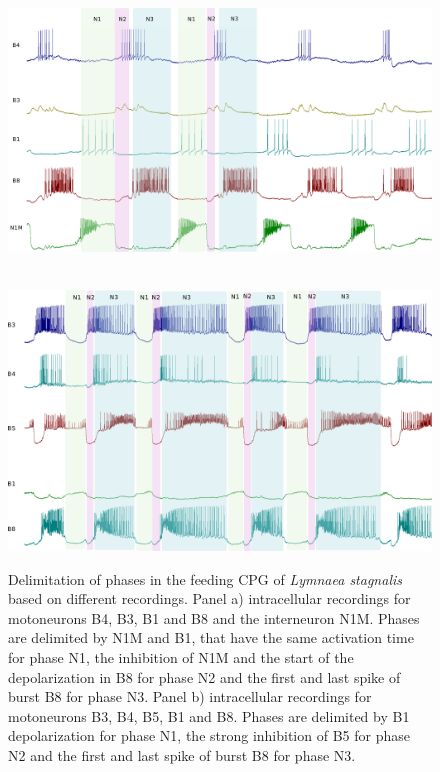 \begin{figure}[bth!]
	\centering
	\begin{minipage}[b]{0.9\textwidth}
		\\
		\centering
		\includegraphics[width=\textwidth]{img/invariants/example_phases_1.pdf}
	\end{minipage}
	\vspace{20pt}
	\begin{minipage}[b]{0.9\textwidth}
		\\
		\centering
		\includegraphics[width=\textwidth]{img/invariants/example_phases_2.pdf}
	\end{minipage}
	\caption{Delimitation of phases in the feeding CPG of \textit{Lymnaea stagnalis} based on different recordings. Panel a) intracellular recordings for motoneurons B4, B3, B1 and B8 and the interneuron N1M. Phases are delimited by N1M and B1, that have the same activation time for phase N1, the inhibition of N1M and the start of the depolarization in B8 for phase N2 and the first and last spike of burst B8 for phase N3. Panel b) intracellular recordings for motoneurons B3, B4, B5, B1 and B8. Phases are delimited by B1 depolarization for phase N1, the strong inhibition of B5 for phase N2 and the first and last spike of burst B8 for phase N3.}
	\label{fig:example lymnaea phases recording}
\end{figure}

